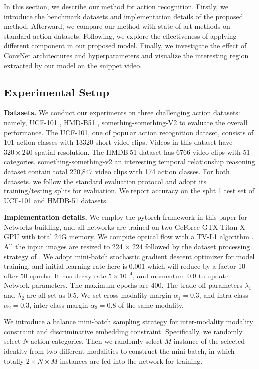 \documentclass[conference,compsoc]{IEEEtran}
\begin{document}
In this section, we describe our method for action recognition. Firstly, we introduce the benchmark datasets and implementation details of the proposed method. Afterward, we compare our method with state-of-art methods on standard action datasets. Following, we explore the effectiveness of applying different component in our proposed model. Finally, we investigate the effect of ConvNet architectures and hyperparameters and visualize the interesting region extracted by our model on the snippet video.

\subsection{Experimental Setup}

\noindent\textbf{Datasets.} We conduct our experiments on three challenging action datasets: namely, UCF-101 \cite{soomro2012ucf101}, HMD-B51 \cite{kuehne2013hmdb51}, something-something-V2 \cite{mahdisoltani2018fine} to evaluate the overall performance. The UCF-101, one of popular action recognition dataset, consists of 101 action classes with 13320 short video clips. Videos in this dataset have $320 \times 240$ spatial resolution. The HMDB-51 dataset has 6766 video clips with 51 categories. something-something-v2 an interesting temporal relationship reasoning dataset contain total 220,847 video clips with 174 action classes. For both datasets, we follow the standard evaluation protocol and adopt its training/testing splits for evaluation. We report accuracy on the split 1 test set of UCF-101 and HMDB-51 datasets.

\noindent\textbf{Implementation details.} We employ the pytorch framework in this paper for Networks building, and all networks are trained on two GeForce GTX Titan X GPU with total 24G memory. We compute optical flow with a TV-L1 algorithm \cite{perez2013tv}. All the input images are resized to 224 $\times$ 224 followed by the dataset processing strategy of \cite{wang2016temporal}. We adopt mini-batch stochastic gradient descent optimizer for model training, and initial learning rate here is 0.001 which will reduce by a factor 10 after 50 epochs. It has decay rate $5 \times 10^{-4}$, and momentum 0.9 to update Network parameters. The maximum epochs are 400. The trade-off parameters $\lambda_{1}$ and $\lambda_{2}$ are all set as $0.5$. We set cross-modality margin $\alpha_{1}=0.3$, and intra-class $\alpha_{2}=0.3$, inter-class margin $\alpha_{3}=0.8$ of the same modality.

We introduce a balance mini-batch sampling strategy for inter-modality modality constraint and discriminative embedding constraint. Specifically, we randomly select $N$ action categories. Then we randomly select $M$ instance of the selected identity from two different modalities to construct the mini-batch, in which totally $2 \times N \times M $ instances are fed into the network for training.
\end{document}

